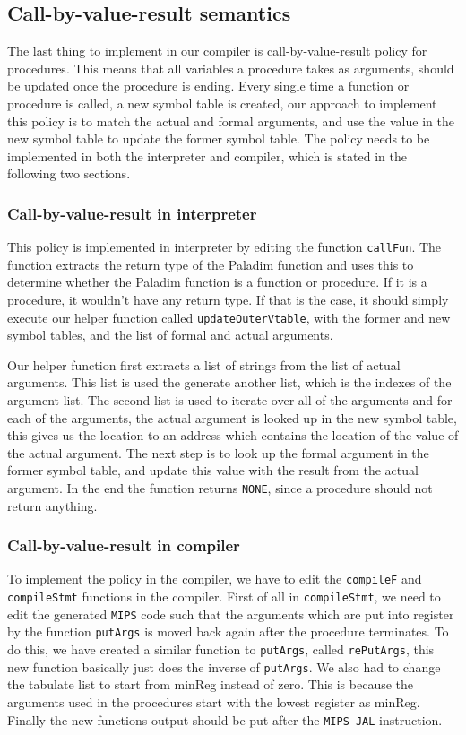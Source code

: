 \documentclass[10pt]{article}
\begin{document}
\subsection{Call-by-value-result semantics}
The last thing to implement in our compiler is call-by-value-result policy for procedures. This means that all variables a procedure takes as arguments, should be updated once the procedure is ending. Every single time a function or procedure is called, a new symbol table is created, our approach to implement this policy is to match the actual and formal arguments, and use the value in the new symbol table to update the former symbol table. The policy needs to be implemented in both the interpreter and compiler, which is stated in the following two sections.

\subsubsection{Call-by-value-result in interpreter}
This policy is implemented in interpreter by editing the function \texttt{callFun}. The function extracts the return type of the Paladim function and uses this to determine whether the Paladim function is a function or procedure. If it is a procedure, it wouldn't have any return type. If that is the case, it should simply execute our helper function called \texttt{updateOuterVtable}, with the former and new symbol tables, and the list of formal and actual arguments.

Our helper function first extracts a list of strings from the list of actual arguments. This list is used the generate another list, which is the indexes of the argument list. The second list is used to iterate over all of the arguments and for each of the arguments, the actual argument is looked up in the new symbol table, this gives us the location to an address which contains the location of the value of the actual argument. The next step is to look up the formal argument in the former symbol table, and update this value with the result from the actual argument. In the end the function returns \texttt{NONE}, since a procedure should not return anything.

\subsubsection{Call-by-value-result in compiler}
To implement the policy in the compiler, we have to edit the \texttt{compileF} and \texttt{compileStmt} functions in the compiler. First of all in \texttt{compileStmt}, we need to edit the generated \texttt{MIPS} code such that the arguments which are put into register by the function \texttt{putArgs} is moved back again after the procedure terminates. To do this, we have created a similar function to \texttt{putArgs}, called \texttt{rePutArgs}, this new function basically just does the inverse of \texttt{putArgs}. We also had to change the tabulate list to start from minReg instead of zero. This is because the arguments used in the procedures start with the lowest register as minReg. Finally the new functions output should be put after the \texttt{MIPS JAL} instruction.
\end{document}
